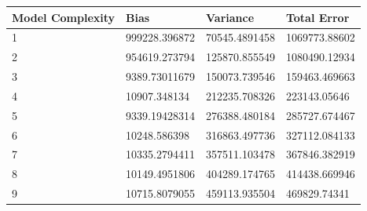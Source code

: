 \documentclass[11pt]{article}
\begin{document}
	\begin{center}
		\begin{tabular}{|l|l|l|l|}
			\hline
			\textbf{Model Complexity} & \textbf{Bias} & \textbf{Variance} & \textbf{Total Error} \\ \hline
			1                         & 999228.396872 & 70545.4891458     & 1069773.88602        \\ \hline
			2                         & 954619.273794 & 125870.855549     & 1080490.12934        \\ \hline
			3                         & 9389.73011679 & 150073.739546     & 159463.469663        \\ \hline
			4                         & 10907.348134  & 212235.708326     & 223143.05646         \\ \hline
			5                         & 9339.19428314 & 276388.480184     & 285727.674467        \\ \hline
			6                         & 10248.586398  & 316863.497736     & 327112.084133        \\ \hline
			7                         & 10335.2794411 & 357511.103478     & 367846.382919        \\ \hline
			8                         & 10149.4951806 & 404289.174765     & 414438.669946        \\ \hline
			9                         & 10715.8079055 & 459113.935504     & 469829.74341         \\ \hline
		\end{tabular}
	\end{center}
\end{document}
